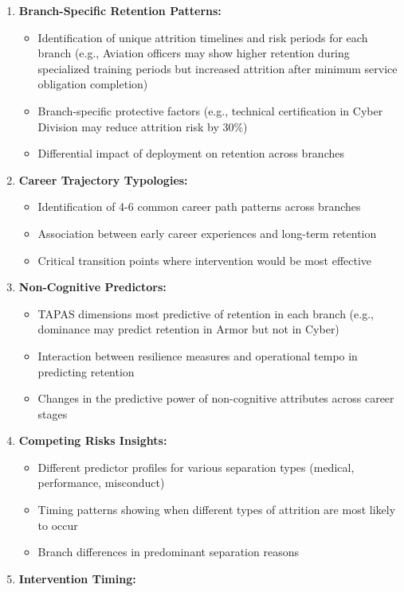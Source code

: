 \documentclass[./main.tex]{subfiles}
\providecommand{\tightlist}{%
  \setlength{\itemsep}{0pt}\setlength{\parskip}{0pt}}
\begin{document}
\begin{enumerate}
\def\labelenumi{\arabic{enumi}.}
\tightlist
\item
  \textbf{Branch-Specific Retention Patterns:}

  \begin{itemize}
  \tightlist
  \item
    Identification of unique attrition timelines and risk periods for
    each branch (e.g., Aviation officers may show higher retention
    during specialized training periods but increased attrition after
    minimum service obligation completion)
  \item
    Branch-specific protective factors (e.g., technical certification in
    Cyber Division may reduce attrition risk by 30\%)
  \item
    Differential impact of deployment on retention across branches
  \end{itemize}
\item
  \textbf{Career Trajectory Typologies:}

  \begin{itemize}
  \tightlist
  \item
    Identification of 4-6 common career path patterns across branches
  \item
    Association between early career experiences and long-term retention
  \item
    Critical transition points where intervention would be most
    effective
  \end{itemize}
\item
  \textbf{Non-Cognitive Predictors:}

  \begin{itemize}
  \tightlist
  \item
    TAPAS dimensions most predictive of retention in each branch (e.g.,
    dominance may predict retention in Armor but not in Cyber)
  \item
    Interaction between resilience measures and operational tempo in
    predicting retention
  \item
    Changes in the predictive power of non-cognitive attributes across
    career stages
  \end{itemize}
\item
  \textbf{Competing Risks Insights:}

  \begin{itemize}
  \tightlist
  \item
    Different predictor profiles for various separation types (medical,
    performance, misconduct)
  \item
    Timing patterns showing when different types of attrition are most
    likely to occur
  \item
    Branch differences in predominant separation reasons
  \end{itemize}
\item
  \textbf{Intervention Timing:}


\end{enumerate}
\end{document}
